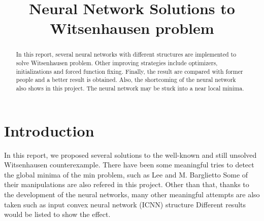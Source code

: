 \documentclass[conference,compsoc]{IEEEtran}
\begin{document}
%
\title{Neural Network Solutions to Witsenhausen problem}
\author{
}


\maketitle

\begin{abstract}
 In this report, several neural networks with different structures are implemented to solve Witsenhausen problem. Other improving strategies include optimizers, initializations and forced function fixing. Finally, the result are compared with former people and a better result is obtained. Also, the shortcoming of the neural network also shows in this project. The neural network may be stuck into a near local minima.
\end{abstract}


\section{Introduction}
  In this report, we proposed several solutions to the well-known and still unsolved Witsenhausen counterexample. \cite{witsenhausen1968counterexample} There have been some meaningful tries to detect the global minima of the min problem, such as Lee \cite{lee2001witsenhausen}and M. Barglietto \cite{baglietto2001numerical} Some of their manipulations are also refered in this project. Other than that, thanks to the development of the neural networks, many other meaningful attempts are also taken such as input convex neural network (ICNN) structure \cite{amos2017input} Different results would be listed to show the effect.


%
\end{document}
